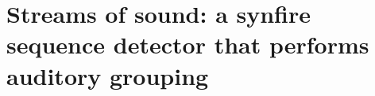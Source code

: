 \documentclass[letterpaper,12pt]{report}
\begin{document}
 \chapter{Streams of sound: a synfire sequence detector that performs auditory grouping}
 
 
% 
% 
% 
% 
% 
% 
% 
% 
% 
% 
% 
% 
% 
% 
% 
% 
% 
% 
% 
% 

\onehalfspacing
\end{document}
